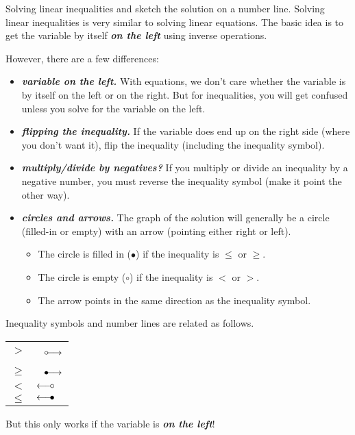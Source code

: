 

\begin{myConcept}{Solving linear inequalities and sketch the solution on a number line.}
    Solving linear inequalities
    is very similar to solving linear equations.
    The basic idea is to get the variable by itself {\bfseries\itshape on the left}
    using inverse operations.

    However, there are a few differences:
    \begin{itemize}
        \item {\bfseries\itshape variable on the left.}
        With equations, we don't care whether the variable is by itself on the left or on the right. 
        But for inequalities, you will get confused unless you solve for the variable on the left.
        \item {\bfseries\itshape flipping the inequality.}
        If the variable does end up on the right side (where you don't want it),
        flip the inequality (including the inequality symbol).
        \item {\bfseries\itshape multiply/divide by negatives?}
        If you multiply or divide an inequality by a negative number,
        you must reverse the inequality symbol (make it point the other way).
        \item {\bfseries\itshape circles and arrows.}
        The graph of the solution will generally be a circle (filled-in or empty) 
        with an arrow (pointing either right or left).
        \begin{itemize}
            \item The circle is filled in ({$\bullet$}) if the inequality is $\le$ or $\ge$.
            \item The circle is empty ({$\circ$}) if the inequality is $<$ or $>$.
            \item The arrow points in the same direction as the inequality symbol.
        \end{itemize}
    \end{itemize}
\end{myConcept}

\begin{center}
\begin{tcolorbox}[width=4in]
    Inequality symbols and number lines are related as follows.
    \begin{center}
        \huge
        \begin{tabular}{c|l}
            $>$     &   \quad\,\, $\circ\kern-0.5em\longrightarrow$   \\
            $\ge$   &   \quad\,\, $\bullet\kern-0.5em\longrightarrow$   \\
            $<$     &   $\longleftarrow\kern-0.5em\circ$  \\
            $\le$   &   $\longleftarrow\kern-0.5em\bullet$
        \end{tabular}
    \end{center}
    But this only works if the variable is {\bfseries\itshape on the left}!
\end{tcolorbox}
\end{center}


